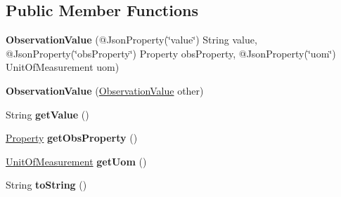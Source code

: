 \subsection*{Public Member Functions}
\begin{DoxyCompactItemize}
\item 
\mbox{\label{classeu_1_1h2020_1_1symbiote_1_1model_1_1cim_1_1ObservationValue_a3d9c047bcaa8b5567402f58bd41de6b1}} 
{\bfseries Observation\+Value} (@Json\+Property(\char`\"{}value\char`\"{}) String value, @Json\+Property(\char`\"{}obs\+Property\char`\"{}) Property obs\+Property, @Json\+Property(\char`\"{}uom\char`\"{}) Unit\+Of\+Measurement uom)
\item 
\mbox{\label{classeu_1_1h2020_1_1symbiote_1_1model_1_1cim_1_1ObservationValue_abe8ecb9c705d4d576eb707f4c5074821}} 
{\bfseries Observation\+Value} (\hyperlink{classeu_1_1h2020_1_1symbiote_1_1model_1_1cim_1_1ObservationValue}{Observation\+Value} other)
\item 
\mbox{\label{classeu_1_1h2020_1_1symbiote_1_1model_1_1cim_1_1ObservationValue_a7d02f86bd318d89bf32cdb2f3ddb8a62}} 
String {\bfseries get\+Value} ()
\item 
\mbox{\label{classeu_1_1h2020_1_1symbiote_1_1model_1_1cim_1_1ObservationValue_a39d9c506ec9bf6f323d5c45dfddd7b13}} 
\hyperlink{classeu_1_1h2020_1_1symbiote_1_1model_1_1cim_1_1Property}{Property} {\bfseries get\+Obs\+Property} ()
\item 
\mbox{\label{classeu_1_1h2020_1_1symbiote_1_1model_1_1cim_1_1ObservationValue_a9ff1a3d4383a648de39e429043055861}} 
\hyperlink{classeu_1_1h2020_1_1symbiote_1_1model_1_1cim_1_1UnitOfMeasurement}{Unit\+Of\+Measurement} {\bfseries get\+Uom} ()
\item 
\mbox{\label{classeu_1_1h2020_1_1symbiote_1_1model_1_1cim_1_1ObservationValue_a4c320aae7b9ebd612517482c9e6fc71c}} 
String {\bfseries to\+String} ()
\item 

\end{DoxyCompactItemize}
